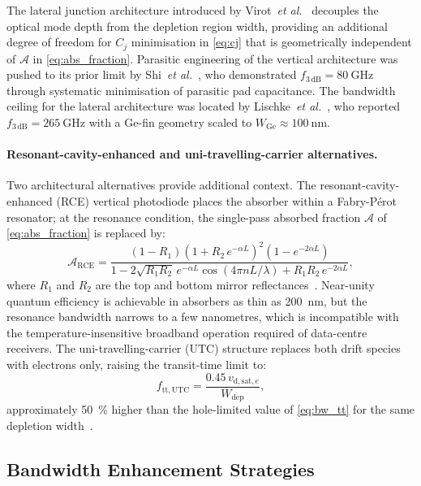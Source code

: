 The lateral junction architecture introduced by Virot~\textit{et al.}~\cite{Virot2017}
decouples the optical mode depth from the depletion region width, providing an
additional degree of freedom for $C_j$ minimisation in \cref{eq:cj} that is
geometrically independent of $\mathcal{A}$ in \cref{eq:abs_fraction}. Parasitic
engineering of the vertical architecture was pushed to its prior limit by
Shi~\textit{et al.}~\cite{Shi2021}, who demonstrated
$f_{3\,\mathrm{dB}}=\SI{80}{\giga\hertz}$ through systematic minimisation of
parasitic pad capacitance. The bandwidth ceiling for the lateral architecture
was located by Lischke~\textit{et al.}~\cite{Lischke2021}, who reported
$f_{3\,\mathrm{dB}}=\SI{265}{\giga\hertz}$ with a Ge-fin geometry scaled to
$W_{\mathrm{Ge}}\approx\SI{100}{\nano\metre}$.

\paragraph{Resonant-cavity-enhanced and uni-travelling-carrier alternatives.}
Two architectural alternatives provide additional context. The
resonant-cavity-enhanced (RCE) vertical photodiode places the absorber within
a Fabry-P\'erot resonator; at the resonance condition, the single-pass absorbed
fraction $\mathcal{A}$ of \cref{eq:abs_fraction} is replaced by:
\begin{equation}
    \mathcal{A}_{\mathrm{RCE}}
    = \frac{(1-R_1)(1+R_2\,e^{-\alpha L})^2(1-e^{-2\alpha L})}
           {1-2\sqrt{R_1R_2}\,e^{-\alpha L}\cos(4\pi nL/\lambda)
            +R_1R_2\,e^{-2\alpha L}},
    \label{eq:rce_absorption}
\end{equation}
where $R_1$ and $R_2$ are the top and bottom mirror reflectances~\cite{Yan2024}.
Near-unity quantum efficiency is achievable in absorbers as thin as
\SI{200}{\nano\metre}, but the resonance bandwidth narrows to a few nanometres,
which is incompatible with the temperature-insensitive broadband operation required
of data-centre receivers. The uni-travelling-carrier (UTC) structure replaces
both drift species with electrons only, raising the transit-time limit to:
\begin{equation}
    f_{\mathrm{tt,UTC}}=\frac{0.45\,v_{\mathrm{d,sat},e}}{W_{\mathrm{dep}}},
    \label{eq:bw_tt_utc}
\end{equation}
approximately \SI{50}{\percent} higher than the hole-limited value of
\cref{eq:bw_tt} for the same depletion width~\cite{Yan2024}.

\subsection[Bandwidth Enhancement Strategies]{Bandwidth Enhancement Strategies}
\label{subsec:pd_bw_strategies}

